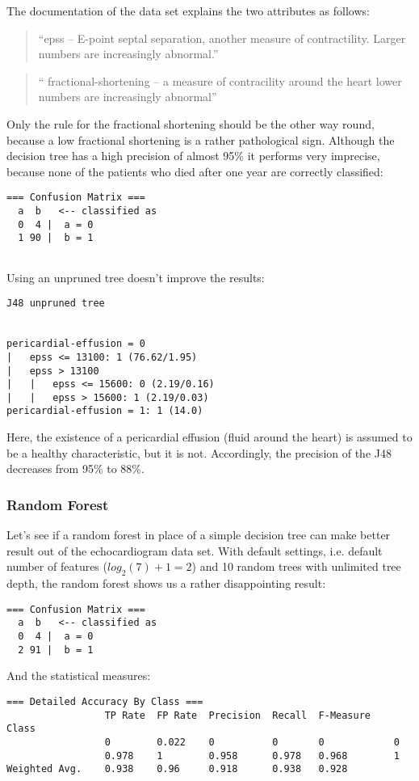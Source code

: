 \documentclass[paper=a4, fontsize=11pt]{scrartcl} %
\numberwithin{equation}{section} %
\numberwithin{figure}{section} %
\numberwithin{table}{section} %
\begin{document}
The documentation of the data set explains the two attributes as follows:
\begin{quote}
``epss -- E-point septal separation, another measure of contractility. Larger numbers are increasingly abnormal.''
\end{quote}
\begin{quote}
`` fractional-shortening -- a measure of contracility around the heart lower numbers are increasingly abnormal''
\end{quote}

Only the rule for the fractional shortening should be the other way round, because a low fractional shortening is a rather pathological sign. Although the decision tree has a high precision of almost 95\% it performs very imprecise, because none of the patients who died after one year are correctly classified:

\begin{lstlisting}
=== Confusion Matrix ===
  a  b   <-- classified as
  0  4 |  a = 0
  1 90 |  b = 1
    
\end{lstlisting}

Using an unpruned tree doesn't improve the results:
\begin{lstlisting}
J48 unpruned tree


pericardial-effusion = 0
|   epss <= 13100: 1 (76.62/1.95)
|   epss > 13100
|   |   epss <= 15600: 0 (2.19/0.16)
|   |   epss > 15600: 1 (2.19/0.03)
pericardial-effusion = 1: 1 (14.0)
\end{lstlisting}
Here, the existence of a pericardial effusion (fluid around the heart) is assumed to be a healthy characteristic, but it is not. Accordingly, the precision of the J48 decreases from 95\% to 88\%.

\subsubsection{Random Forest}
Let's see if a random forest in place of a simple decision tree can make better result out of the echocardiogram data set. With default settings, i.e. default number of features ($ log_2(7) + 1 = 2 $) and 10 random trees with unlimited tree depth, the random forest shows us a rather disappointing result:

\begin{lstlisting}
=== Confusion Matrix ===
  a  b   <-- classified as
  0  4 |  a = 0
  2 91 |  b = 1
\end{lstlisting}
And the statistical measures:
\begin{lstlisting}
=== Detailed Accuracy By Class ===
                 TP Rate  FP Rate  Precision  Recall  F-Measure    Class
                 0        0.022    0          0       0            0
                 0.978    1        0.958      0.978   0.968        1
Weighted Avg.    0.938    0.96     0.918      0.938   0.928     
\end{lstlisting}
\end{document}

